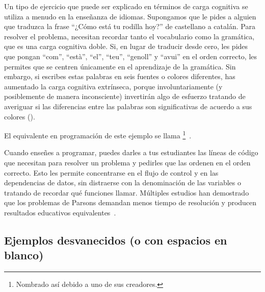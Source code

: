 Un tipo de ejercicio que puede ser explicado en términos de carga cognitiva
se utiliza a menudo en la enseñanza de idiomas.
Supongamos que le pides a alguien que traduzca la frase
``¿Cómo está tu rodilla hoy?'' de castellano a catalán.
Para resolver el problema, necesitan recordar tanto el vocabulario
como la gramática, que es una carga cognitiva doble.
Si, en lugar de traducir desde cero, les pides que pongan ``com'', ``està'', ``el'', ``teu'', ``genoll'' y ``avui'' en el orden correcto,
les permites que se centren únicamente en el aprendizaje de la gramática.
Sin embargo, si escribes estas palabras en seis fuentes o colores diferentes,
has aumentado la carga cognitiva extrínseca, porque involuntariamente
(y posiblemente de manera inconsciente) invertirán algo de esfuerzo tratando de averiguar
si las diferencias entre las palabras son significativas de acuerdo a sus colores ().


El equivalente en programación de este ejemplo
se llama \footnote{Nombrado así debido a uno de sus creadores.}~\cite{Pars2006}.

Cuando enseñes a programar,
puedes darles a tus estudiantes las líneas de código que necesitan para resolver un problema
y pedirles que las ordenen en el orden correcto.
Esto les permite concentrarse en el flujo de control y en las dependencias de datos,
sin distraerse con la denominación de las variables o tratando de recordar qué funciones llamar.
Múltiples estudios han demostrado que los problemas de Parsons demandan menos tiempo de resolución 
y producen resultados educativos equivalentes~\cite{Eric2017}.


\subsection*{Ejemplos desvanecidos (o con espacios en blanco)}

